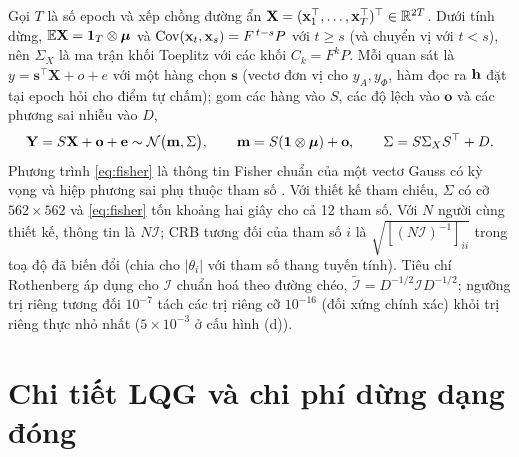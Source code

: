 Gọi $T$ là số epoch và xếp chồng đường ẩn $\mathbf X=(\mathbf{x}_1^\top,\dots,\mathbf{x}_T^\top)^\top\in\mathbb{R}^{2T}$. Dưới tính dừng, $\mathbb{E}\mathbf X=\mathbf{1}_T\otimes\boldsymbol{\mu}$ và $\operatorname{Cov}(\mathbf{x}_t,\mathbf{x}_s)=F^{\,t-s}P$ với $t\ge s$ (và chuyển vị với $t<s$), nên $\Sigma_X$ là ma trận khối Toeplitz với các khối $C_k=F^kP$. Mỗi quan sát là $y=\mathbf s^\top\mathbf X+o+e$ với một hàng chọn $\mathbf s$ (vectơ đơn vị cho $y_A,y_\Phi$, hàm đọc ra $\mathbf{h}$ đặt tại epoch hỏi cho điểm tự chấm); gom các hàng vào $S$, các độ lệch vào $\mathbf o$ và các phương sai nhiễu vào $D$,
\[
\mathbf Y=S\mathbf X+\mathbf o+\mathbf e\sim\mathcal N\bigl(\mathbf m,\Sigma\bigr),\qquad
\mathbf m=S(\mathbf{1}\otimes\boldsymbol{\mu})+\mathbf o,\qquad \Sigma=S\Sigma_XS^\top+D .
\]
Phương trình \eqref{eq:fisher} là thông tin Fisher chuẩn của một vectơ Gauss có kỳ vọng và hiệp phương sai phụ thuộc tham số \citep{Ljung1999}. Với thiết kế tham chiếu, $\Sigma$ có cỡ $562\times562$ và \eqref{eq:fisher} tốn khoảng hai giây cho cả 12 tham số. Với $N$ người cùng thiết kế, thông tin là $N\mathcal I$; CRB tương đối của tham số $i$ là $\sqrt{[(N\mathcal I)^{-1}]_{ii}}$ trong toạ độ đã biến đổi (chia cho $|\theta_i|$ với tham số thang tuyến tính). Tiêu chí Rothenberg áp dụng cho $\mathcal I$ chuẩn hoá theo đường chéo, $\tilde{\mathcal I}=D^{-1/2}\mathcal ID^{-1/2}$; ngưỡng trị riêng tương đối $10^{-7}$ tách các trị riêng cỡ $10^{-16}$ (đối xứng chính xác) khỏi trị riêng thực nhỏ nhất ($5\times10^{-3}$ ở cấu hình (d)).

\section{Chi tiết LQG và chi phí dừng dạng đóng}
\label{app:lqg}


